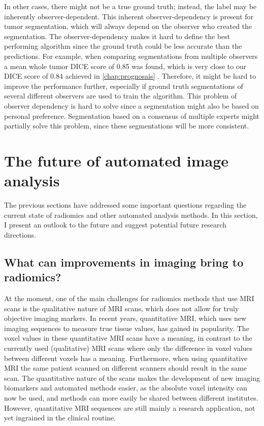 In other cases, there might not be a true ground truth; instead, the label may be inherently observer-dependent.
This inherent observer-dependency is present for \gls{tumor} segmentation, which will always depend on the observer who created the segmentation.
The observer-dependency makes it hard to define the best performing algorithm since the ground truth could be less accurate than the predictions.
For example, when comparing segmentations from multiple observers a mean whole \gls{tumor} DICE score of 0.85 was found, which is very close to our DICE score of 0.84 achieved in \cref{chap:prognosais} \autocite{menze2015brats}.
Therefore, it might be hard to improve the performance further, especially if ground truth segmentations of several different observers are used to train the algorithm.
This problem of observer dependency is hard to solve since a segmentation might also be based on personal preference.
Segmentation based on a consensus of multiple experts might partially solve this problem, since these segmentations will be more consistent.

\section{The future of automated image analysis}\label{sec:discussion_future}

The previous sections have addressed some important questions regarding the current state of radiomics and other automated analysis methods.
In this section, I present an outlook to the future and suggest potential future research directions.


\subsection{What can improvements in imaging bring to radiomics?}\label{sec:dicussion_new_imaging}

At the moment, one of the main challenges for radiomics methods that use \gls{MRI} scans is the qualitative nature of \gls{MRI} scans, which does not allow for truly objective imaging markers.
In recent years, quantitative \gls{MRI}, which uses new imaging sequences to measure true tissue values, has gained in popularity.
The voxel values in these quantitative \gls{MRI} scans have a meaning, in contrast to the currently used (qualitative) \gls{MRI} scans where only the difference in voxel values between different voxels has a meaning.
Furthermore, when using quantitative \gls{MRI} the same patient scanned on different scanners should result in the same scan.
The quantitative nature of the scans makes the development of new imaging biomarkers and automated methods easier, as the absolute voxel intensity can now be used, and methods can more easily be shared between different institutes.
However, quantitative \gls{MRI} sequences are still mainly a research application, not yet ingrained in the clinical routine.

